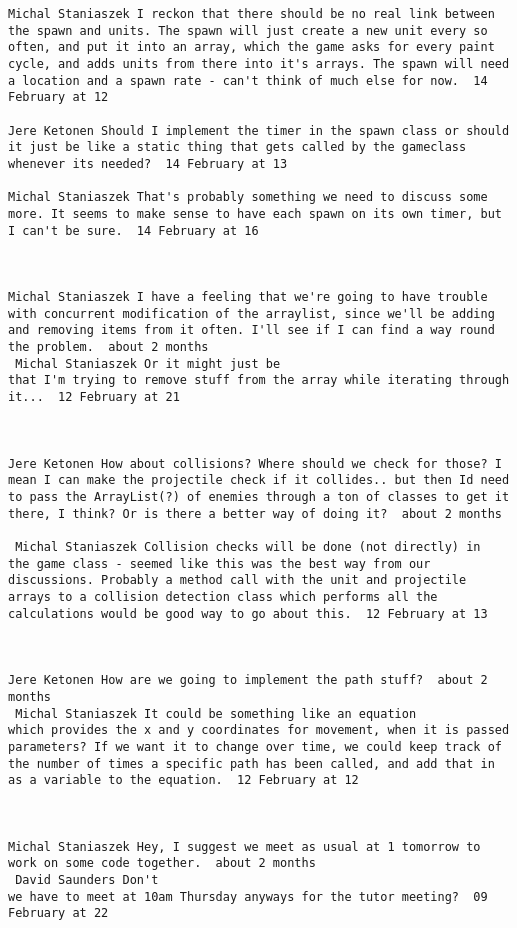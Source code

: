 \documentclass[10pt]{report}
\begin{document}
\begin{verbatim}
Michal Staniaszek I reckon that there should be no real link between
the spawn and units. The spawn will just create a new unit every so
often, and put it into an array, which the game asks for every paint
cycle, and adds units from there into it's arrays. The spawn will need
a location and a spawn rate - can't think of much else for now.  14
February at 12

Jere Ketonen Should I implement the timer in the spawn class or should
it just be like a static thing that gets called by the gameclass
whenever its needed?  14 February at 13

Michal Staniaszek That's probably something we need to discuss some
more. It seems to make sense to have each spawn on its own timer, but
I can't be sure.  14 February at 16



Michal Staniaszek I have a feeling that we're going to have trouble
with concurrent modification of the arraylist, since we'll be adding
and removing items from it often. I'll see if I can find a way round
the problem.  about 2 months 
 Michal Staniaszek Or it might just be
that I'm trying to remove stuff from the array while iterating through
it...  12 February at 21



Jere Ketonen How about collisions? Where should we check for those? I
mean I can make the projectile check if it collides.. but then Id need
to pass the ArrayList(?) of enemies through a ton of classes to get it
there, I think? Or is there a better way of doing it?  about 2 months

 Michal Staniaszek Collision checks will be done (not directly) in
the game class - seemed like this was the best way from our
discussions. Probably a method call with the unit and projectile
arrays to a collision detection class which performs all the
calculations would be good way to go about this.  12 February at 13



Jere Ketonen How are we going to implement the path stuff?  about 2
months 
 Michal Staniaszek It could be something like an equation
which provides the x and y coordinates for movement, when it is passed
parameters? If we want it to change over time, we could keep track of
the number of times a specific path has been called, and add that in
as a variable to the equation.  12 February at 12



Michal Staniaszek Hey, I suggest we meet as usual at 1 tomorrow to
work on some code together.  about 2 months 
 David Saunders Don't
we have to meet at 10am Thursday anyways for the tutor meeting?  09
February at 22


\end{verbatim}
\end{document}
